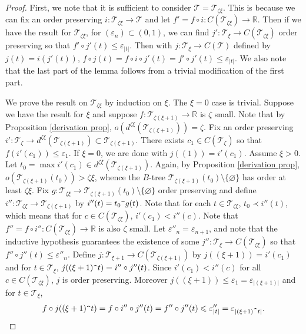 \documentclass[12pt]{amsart}
\theoremstyle{definition}
\newcommand{\rr}{\mathbb{R}}
\newcommand{\ttt}{\mathcal{T}}
\begin{document}
\begin{proof} First, we note that it is sufficient to consider $\ttt=\ttt_{\zeta\xi}$.  This is because we can fix an order preserving $i:\ttt_{\zeta\xi}\to \ttt$ and let $f'=f\circ i:C(\ttt_{\zeta\xi})\to \rr$.  Then if we have the result for $\ttt_{\zeta\xi}$, for $(\varepsilon_n)\subset (0,1)$, we can find $j':\ttt_\xi\to C(\ttt_{\zeta\xi})$ order preserving so that $f'\circ j'(t)\leqslant \varepsilon_{|t|}$.  Then with $j:\ttt_\xi\to C(\ttt)$ defined by $j(t)=i(j'(t))$, $f\circ j(t)= f\circ i\circ j'(t)= f'\circ j'(t)\leqslant \varepsilon_{|t|}$.  We also note that the last part of the lemma follows from a trivial modification of the first part.  

We prove the result on $\ttt_{\zeta\xi}$ by induction on $\xi$.  The $\xi=0$ case is trivial.  Suppose we have the result for $\xi$ and suppose $f:\ttt_{\zeta(\xi+1)}\to \rr$ is $\zeta$ small.  Note that by Proposition \ref{derivation prop}, $o(d^{\zeta\xi}(\ttt_{\zeta(\xi+1)}))=\zeta$.  Fix an order preserving $i':\ttt_\zeta\to d^{\zeta\xi}(\ttt_{\zeta(\xi+1)})\subset \ttt_{\zeta(\xi+1)}$.  There exists $c_1\in C(\ttt_\zeta)$ so that $f(i'(c_1))\leqslant \varepsilon_1$. If $\xi=0$, we are done with $j((1))=i'(c_1)$. Assume $\xi>0$. Let $t_0=\max i'(c_1)\in d^{\zeta\xi}(\ttt_{\zeta(\xi+1)})$.  Again, by Proposition \ref{derivation prop}, $o(\ttt_{\zeta(\xi+1)}(t_0))>\zeta\xi$, whence the $B$-tree $\ttt_{\zeta(\xi+1)}(t_0)\setminus \{\varnothing\}$ has order at least $\zeta\xi$.  Fix $g:\ttt_{\zeta\xi}\to \ttt_{\zeta(\xi+1)}(t_0)\setminus \{\varnothing\}$ order preserving and define $i'':\ttt_{\zeta\xi}\to \ttt_{\zeta(\xi+1)}$ by $i''(t)=t_0\verb!^!g(t)$.  Note that for each $t\in \ttt_{\zeta\xi}$, $t_0\prec i''(t)$, which means that for $c\in C(\ttt_{\zeta\xi})$, $i'(c_1)< i''(c)$.  Note that $f''= f\circ i'':C(\ttt_{\zeta\xi})\to \rr$ is also $\zeta$ small.  Let $\varepsilon''_n= \varepsilon_{n+1}$, and note that the inductive hypothesis guarantees the existence of some $j'':\ttt_\xi\to C(\ttt_{\zeta\xi})$ so that $f''\circ j''(t)\leqslant \varepsilon''_n$.  Define $j:\ttt_{\xi+1}\to C(\ttt_{\zeta(\xi+1)})$ by $j((\xi+1))=i'(c_1)$ and for $t\in \ttt_\xi$, $j((\xi+1)\verb!^!t)= i''\circ j''(t)$. Since $i'(c_1)<i''(c)$ for all $c\in C(\ttt_{\zeta\xi})$, $j$ is order preserving.   Moreover $j((\xi+1))\leqslant \varepsilon_1=\varepsilon_{|(\xi+1)|}$ and for $t\in \ttt_\xi$, $$f\circ j((\xi+1)\verb!^!t)= f\circ i''\circ j''(t)=f''\circ j''(t)\leqslant \varepsilon''_{|t|}=\varepsilon_{|(\xi+1)\verb!^!t|}.$$  



\end{proof}
\end{document}
